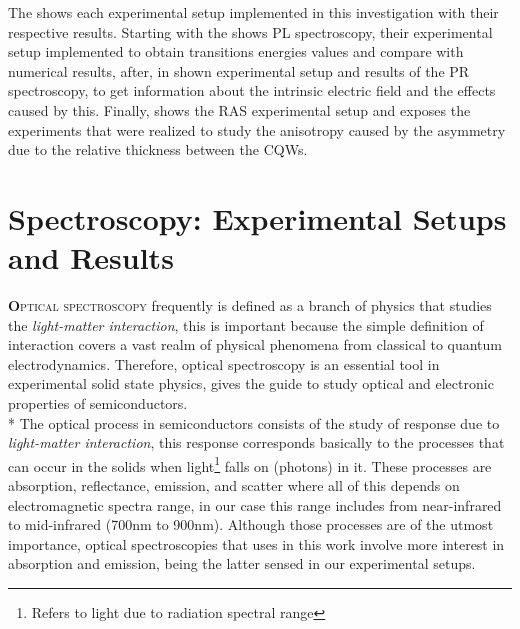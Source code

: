 The   shows each experimental setup implemented in this investigation with their respective results. Starting with the   shows PL spectroscopy, their experimental setup implemented to obtain transitions energies values and compare with numerical results, after,  in  shown experimental setup and results of the PR spectroscopy, to get information about the intrinsic electric field and the effects caused by this. Finally,   shows the RAS experimental setup and exposes the experiments that were realized to study the anisotropy caused by the asymmetry due to the relative thickness between the CQWs.

\section{Spectroscopy: Experimental Setups and Results}
\label{sec:chapter 3 Spectroscopy}
\vspace{-10mm} 
\lettrine[lines=3, lraise=.1, nindent=0mm, slope=0mm]{\textbf{O}}{ptical spectroscopy} frequently is defined as a branch of physics that studies the \emph{light-matter interaction}, this is important because the simple definition of interaction covers a vast realm of physical phenomena from classical to quantum electrodynamics\cite{weiner2017light}. Therefore, optical spectroscopy is an essential tool in experimental solid state physics, gives the guide to study optical and electronic properties of semiconductors.\\*
The optical process in semiconductors consists of the study of response due to \emph{light-matter interaction}, this response corresponds basically to the processes that can occur in the solids when light\footnote{Refers to light due to radiation spectral range} falls on (photons) in it. These processes are absorption, reflectance, emission, and scatter where all of this depends on electromagnetic spectra range, in our case this range includes from near-infrared to mid-infrared (700nm to 900nm).  Although those processes are of the utmost importance, optical spectroscopies that uses in this work involve more interest in absorption and emission, being the latter sensed in our experimental setups.  \\

